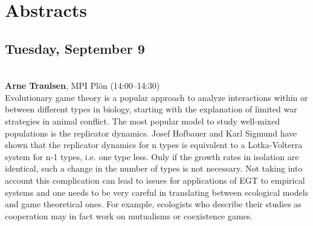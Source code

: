 \documentclass[12pt,a4paper]{article}
\begin{document}
\newpage

\section*{\sffamily Abstracts}
\subsection*{\sffamily Tuesday, September 9}
\bigskip\bigskip
{}\\[1ex]{ \large \textbf{ Arne Traulsen}}, MPI Plön (14:00--14:30) \\[2ex] Evolutionary game theory is a popular approach to analyze interactions within or between different types in biology, starting with the explanation of limited war strategies in animal conflict. The most popular model to study well-mixed populations is the replicator dynamics. Josef Hofbauer and Karl Sigmund have shown that the replicator dynamics for n types is equivalent to a Lotka-Volterra system for n-1 types, i.e. one type less. Only if the growth rates in isolation are identical, such a change in the number of types is not necessary. Not taking into account this complication can lead to issues for applications of EGT to empirical systems and one needs to be very careful in translating between ecological models and game theoretical ones. For example, ecologists who describe their studies as cooperation may in fact work on mutualisms or coexistence games. 
\end{document}
